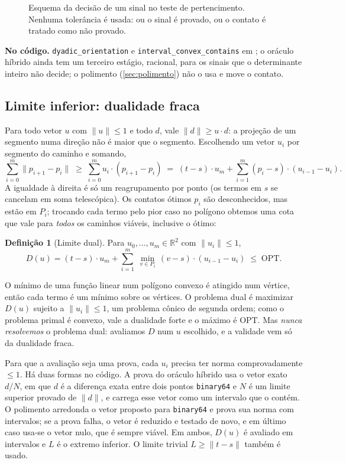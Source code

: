 \documentclass[11pt,a4paper]{article}
\theoremstyle{plain}\newtheorem{proposicao}{Proposição}
\theoremstyle{definition}\newtheorem{definicao}{Definição}
\theoremstyle{plain}\newtheorem{teorema}{Teorema}
\newcommand{\R}{\mathbb R}
\newcommand{\norm}[1]{\lVert#1\rVert}
\newcommand{\OPT}{\mathrm{OPT}}
\newcommand{\code}[1]{\texttt{\small #1}}
\begin{document}
\begin{figure}[ht]\centering\figsinal
\caption{Esquema da decisão de um sinal no teste de pertencimento. Nenhuma tolerância é usada: ou o sinal é provado, ou o contato é tratado como não provado.}\label{fig:sinal}
\end{figure}

\begin{fonte}
\textbf{No código.} \code{dyadic\_orientation} e \code{interval\_convex\_contains} em ; o oráculo híbrido ainda tem um terceiro estágio, racional, para os sinais que o determinante inteiro não decide; o polimento (\cref{sec:polimento}) não o usa e move o contato.
\end{fonte}

\subsection{Limite inferior: dualidade fraca}\label{sec:inferior}
Para todo vetor \(u\) com \(\norm u\le1\) e todo \(d\), vale \(\norm d\ge u\cdot d\): a projeção de um segmento numa direção não é maior que o segmento. Escolhendo um vetor \(u_i\) por segmento do caminho e somando,
\[
\sum_{i=0}^m\norm{p_{i+1}-p_i}\;\ge\;\sum_{i=0}^m u_i\cdot(p_{i+1}-p_i)
\;=\;(t-s)\cdot u_m+\sum_{i=1}^m (p_i-s)\cdot(u_{i-1}-u_i).
\]
A igualdade à direita é só um reagrupamento por ponto (os termos em \(s\) se cancelam em soma telescópica). Os contatos ótimos \(p_i\) são desconhecidos, mas estão em \(P_i\); trocando cada termo pelo pior caso no polígono obtemos uma cota que vale para \emph{todos} os caminhos viáveis, inclusive o ótimo:

\begin{definicao}[Limite dual]\label{def:dual}
Para \(u_0,\dots,u_m\in\R^2\) com \(\norm{u_i}\le1\),
\begin{equation}\label{eq:dual}
D(u)=(t-s)\cdot u_m+\sum_{i=1}^m\;\min_{v\in P_i}\,(v-s)\cdot(u_{i-1}-u_i)\;\le\;\OPT.
\end{equation}
\end{definicao}
O mínimo de uma função linear num polígono convexo é atingido num vértice, então cada termo é um mínimo sobre os vértices. O problema dual é maximizar \(D(u)\) sujeito a \(\norm{u_i}\le1\), um problema cônico de segunda ordem; como o problema primal é convexo, vale a dualidade forte e o máximo é \(\OPT\). Mas \emph{nunca resolvemos} o problema dual: avaliamos \(D\) num \(u\) escolhido, e a validade vem só da dualidade fraca.

Para que a avaliação seja uma prova, cada \(u_i\) precisa ter norma comprovadamente \(\le1\). Há duas formas no código. A prova do oráculo híbrido usa o vetor exato \(d/N\), em que \(d\) é a diferença exata entre dois pontos \texttt{binary64} e \(N\) é um limite superior provado de \(\norm d\), e carrega esse vetor como um intervalo que o contém. O polimento arredonda o vetor proposto para \texttt{binary64} e prova sua norma com intervalos; se a prova falha, o vetor é reduzido e testado de novo, e em último caso usa-se o vetor nulo, que é sempre viável. Em ambos, \(D(u)\) é avaliado em intervalos e \(L\) é o extremo inferior. O limite trivial \(L\ge\norm{t-s}\) também é usado.
\end{document}
